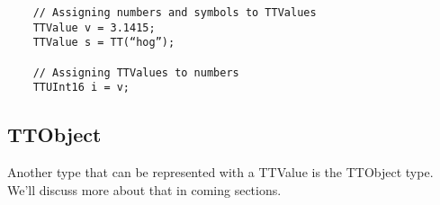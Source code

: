 \begin{small}\begin{verbatim}
	// Assigning numbers and symbols to TTValues
	TTValue v = 3.1415;
	TTValue s = TT(“hog”);

	// Assigning TTValues to numbers
	TTUInt16 i = v;
\end{verbatim}\end{small}



\subsection{TTObject}

Another type that can be represented with a TTValue is the TTObject type.  We’ll discuss more about that in coming sections.



